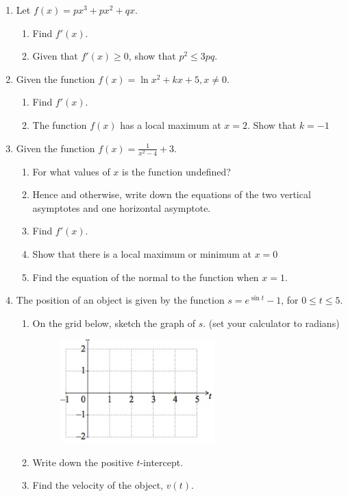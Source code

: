 \documentclass{article}
\begin{document}
\begin{enumerate}
\newpage
\item Let $f(x)=px^3+px^2+qx$.
\begin{enumerate}
    \item Find $f'(x)$.
	\item Given that $f'(x) \geq 0$, show that $p^2 \leq 3pq$.
\end{enumerate}

\item	Given the function $f(x) = \ln{x^2}+kx+5, x \neq 0$.
\begin{enumerate}
    \item Find $f'(x)$.
	\item The function $f(x)$ has a local maximum at $x=2$. Show that $k=-1$
\end{enumerate}

\item Given the function $\displaystyle f(x) = \frac{1}{x^2-4} +3$.
\begin{enumerate}
    \item For what values of $x$ is the function undefined?
    \item Hence and otherwise, write down the equations of the two vertical asymptotes and one horizontal asymptote.
    \item Find $f'(x)$.
    \item Show that there is a local maximum or minimum at $x=0$
    \item Find the equation of the normal to the function when $x = 1$.

\end{enumerate}

\item The position of an object is given by the function $s=e^{\sin t}-1$, for $0 \leq t \leq 5$.
\begin{enumerate}
    \item On the grid below, sketch the graph of $s$. (set your calculator to radians)
    \begin{figure}[!ht]
        \centering
        \includegraphics[width=0.6\textwidth]{sine-graph.jpeg}
    \end{figure}
    \item Write down the positive $t$-intercept.
    \item Find the velocity of the object, $v(t)$.
\end{enumerate}


\end{enumerate}
\end{document}

